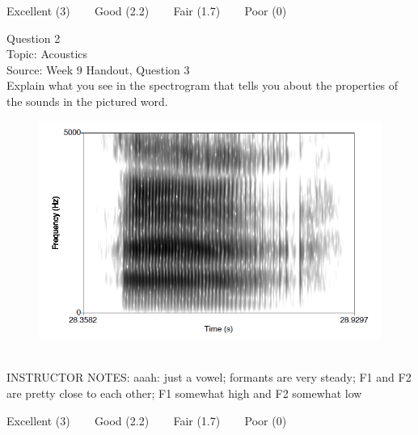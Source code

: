\documentclass[12pt]{article}
\begin{document}
\vfill
Excellent (3) ~~~ Good (2.2) ~~~ Fair (1.7) ~~~ Poor (0)
\newpage

{\large Question 2}\\

Topic: Acoustics\\
Source: Week 9 Handout, Question 3\\

Explain what you see in the spectrogram that tells you about the properties of the sounds in the pictured word.\\

\begin{figure}[H]
\includegraphics{../images/spectrogram_aaah.png}
\end{figure}

~\\
INSTRUCTOR NOTES: aaah: just a vowel; formants are very steady; F1 and F2 are pretty close to each other; F1 somewhat high and F2 somewhat low


\vfill
Excellent (3) ~~~ Good (2.2) ~~~ Fair (1.7) ~~~ Poor (0)
\newpage

\begin{center}
\textbf{{\color{red}{\HUGE END OF EXAM}}}\\

\end{center}
\newpage

\begin{center}
\textbf{{\color{blue}{\HUGE START OF EXAM\\}}}

\textbf{{\color{blue}{\HUGE Student ID: 17359\\}}}

\textbf{{\color{blue}{\HUGE 9:40\\}}}

\end{center}
\newpage
\end{document}
